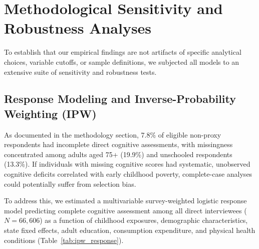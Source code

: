 
\section{Methodological Sensitivity and Robustness Analyses}

To establish that our empirical findings are not artifacts of specific analytical choices, variable cutoffs, or sample definitions, we subjected all models to an extensive suite of sensitivity and robustness tests.

\subsection{Response Modeling and Inverse-Probability Weighting (IPW)}
As documented in the methodology section, 7.8\% of eligible non-proxy respondents had incomplete direct cognitive assessments, with missingness concentrated among adults aged 75+ (19.9\%) and unschooled respondents (13.3\%). If individuals with missing cognitive scores had systematic, unobserved cognitive deficits correlated with early childhood poverty, complete-case analyses could potentially suffer from selection bias.

To address this, we estimated a multivariable survey-weighted logistic response model predicting complete cognitive assessment among all direct interviewees ($N = 66{,}606$) as a function of childhood exposures, demographic characteristics, state fixed effects, adult education, consumption expenditure, and physical health conditions (Table~\ref{tab:ipw_response}).

